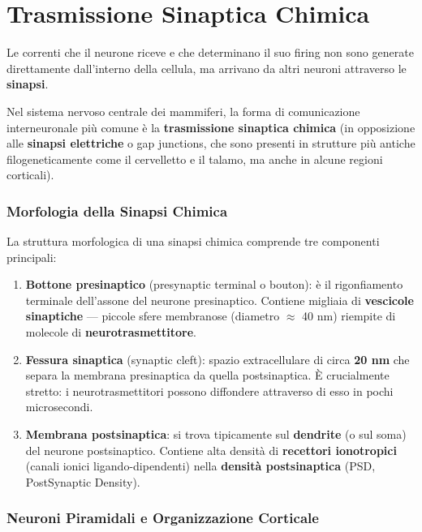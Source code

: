 \section{Trasmissione Sinaptica Chimica}

 Le correnti che il neurone riceve e che determinano il suo firing non sono generate direttamente dall'interno della cellula, ma arrivano da altri neuroni attraverso le \textbf{sinapsi}.

Nel sistema nervoso centrale dei mammiferi, la forma di comunicazione interneuronale più comune è la \textbf{trasmissione sinaptica chimica} (in opposizione alle \textbf{sinapsi elettriche} o gap junctions, che sono presenti in strutture più antiche filogeneticamente come il cervelletto e il talamo, ma anche in alcune regioni corticali).

\subsubsection{Morfologia della Sinapsi Chimica}

La struttura morfologica di una sinapsi chimica comprende tre componenti principali:

\begin{enumerate}
    \item \textbf{Bottone presinaptico} (presynaptic terminal o bouton): è il rigonfiamento terminale dell'assone del neurone presinaptico. Contiene migliaia di \textbf{vescicole sinaptiche} — piccole sfere membranose (diametro $\approx$ 40 nm) riempite di molecole di \textbf{neurotrasmettitore}.
    \item \textbf{Fessura sinaptica} (synaptic cleft): spazio extracellulare di circa \textbf{20 nm} che separa la membrana presinaptica da quella postsinaptica. È crucialmente stretto: i neurotrasmettitori possono diffondere attraverso di esso in pochi microsecondi.
    \item \textbf{Membrana postsinaptica}: si trova tipicamente sul \textbf{dendrite} (o sul soma) del neurone postsinaptico. Contiene alta densità di \textbf{recettori ionotropici} (canali ionici ligando-dipendenti) nella \textbf{densità postsinaptica} (PSD, PostSynaptic Density).
\end{enumerate}

\subsubsection{Neuroni Piramidali e Organizzazione Corticale}

